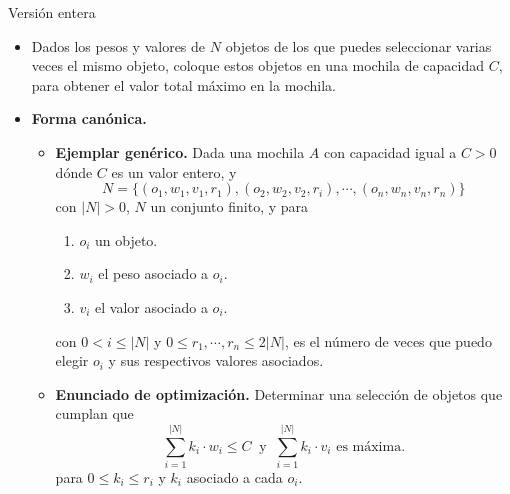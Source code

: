\begin{frame}{Versión entera}
     \begin{itemize}[<+->]
     \item Dados los pesos y valores de $N$ objetos de los que puedes seleccionar varias veces el mismo objeto,
       coloque estos objetos en una mochila de capacidad $C$, para obtener el valor total máximo en la mochila.
       
     \item \textbf{Forma canónica.}
       \begin{itemize}[<+->]
       \item \textbf{Ejemplar genérico.} Dada una mochila $A$ con capacidad igual a $C > 0$
         dónde $C$ es un valor entero, y
         \[N = \{(o_1, w_1, v_1, r_1), (o_2, w_2, v_2, r_i), \dotsm, (o_n, w_n, v_n, r_n)\}\]
         con $|N| > 0$, $N$ un conjunto finito,  y para
         \begin{enumerate}
         \item $o_i$ un objeto. 
         \item $w_i$ el peso asociado a $o_i$.
         \item $v_i$ el valor asociado a $o_i$.
         \end{enumerate}
         con $0 < i \leq |N|$ y $0 \leq r_1, \dotsm, r_n \leq 2|N|$, es el número de veces que
         puedo elegir $o_i$ y sus respectivos valores asociados. 
       \item \textbf{Enunciado de optimización.} Determinar una selección de objetos que cumplan que
         \[\sum_{i=1}^{|N|} k_i \cdot w_i \leq C\ \text{  y  }\ \sum_{i=1}^{|N|} k_i \cdot v_i \text{ es máxima.}\]
         para $0 \leq k_i \leq r_i$ y $k_i$ asociado a cada $o_i$.
       \end{itemize}
     \end{itemize}
\end{frame}

